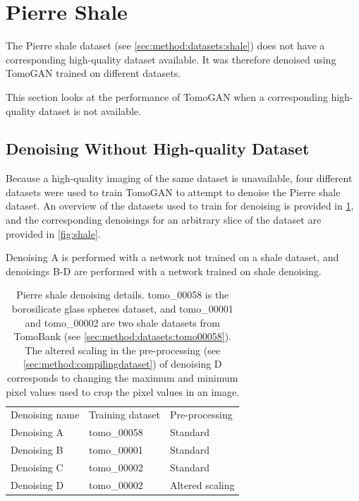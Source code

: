 \section{Pierre Shale}
The Pierre shale dataset (see \cref{sec:method:datasets:shale}) does not have a corresponding high-quality dataset available. It was therefore denoised using TomoGAN trained on different datasets. 

This section looks at the performance of TomoGAN when a corresponding high-quality dataset is not available. 

\subsection{Denoising Without High-quality Dataset}
Because a high-quality imaging of the same dataset is unavailable, four different datasets were used to train TomoGAN to attempt to denoise the Pierre shale dataset. An overview of the datasets used to train for denoising is provided in \cref{tab:pierreshaledenoisingdetails}, and the corresponding denoisings for an arbitrary slice of the dataset are provided in \cref{fig:shale}. 

Denoising A is performed with a network not trained on a shale dataset, and denoisings B-D are performed with a network trained on shale denoising. 

\begin{table}[htbp]
  \centering
  \caption[Pierre shale denoising details]{Pierre shale denoising details. tomo\_00058 is the borosilicate glass spheres dataset, and tomo\_00001 and tomo\_00002 are two shale datasets from TomoBank (see \cref{sec:method:datasets:tomo00058}). The altered scaling in the pre-processing (see \cref{sec:method:compilingdataset}) of denoising D corresponds to changing the maximum and minimum pixel values used to crop the pixel values in an image. }
  \label{tab:pierreshaledenoisingdetails}
  \begin{tabular}{lll}
  \hline
  Denoising name & Training dataset & Pre-processing\\
  \hhline{===}
  Denoising A & tomo\_00058 & Standard \\
  Denoising B & tomo\_00001 & Standard \\
  Denoising C & tomo\_00002 & Standard \\
  Denoising D & tomo\_00002 & Altered scaling \\
  \hline
  \end{tabular}
\end{table}

